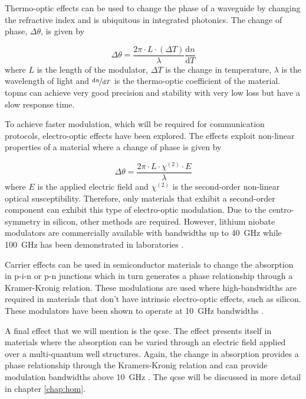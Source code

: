 Thermo-optic effects can be used to change the phase of a waveguide by changing the refractive index and is ubiquitous in integrated photonics. The change of phase, $\Delta\theta$, is given by

\begin{equation}
	\Delta\theta = \frac{2\pi\cdot L\cdot (\Delta T)}{\lambda}\frac{\mathrm{d}n}{\mathrm{d}T}
\end{equation}
where $L$ is the length of the modulator, $\Delta T$ is the change in temperature, $\lambda$ is the wavelength of light and $\nicefrac{\mathrm{d}n}{\mathrm{d}T}$ is the thermo-optic coefficient of the material. \Acp{topm} can achieve very good precision and stability with very low loss but have a slow response time. 

To achieve faster modulation, which will be required for communication protocols, electro-optic effects have been explored. The effects exploit non-linear properties of a material where a change of phase is given by

\begin{equation}
	\Delta\theta = \frac{2\pi\cdot L\cdot  \chi^{(2)}\cdot E}{\lambda}
\end{equation}
where $E$ is the applied electric field and $\chi^{(2)}$ is the second-order non-linear optical susceptibility. Therefore, only materials that exhibit a second-order component can exhibit this type of electro-optic modulation. Due to the centro-symmetry in silicon, other methods are required. However, lithium niobate modulators are commercially available with bandwidths up to \SI{40}{GHz} while \SI{100}{GHz} has been demonstrated in laboratories \cite{Louay2001Advances, Atsushi2010NRZ}.

Carrier effects can be used in semiconductor materials to change the absorption in p-i-n or p-n junctions which in turn generates a phase relationship through a Kramer-Kronig relation. These modulations are used where high-bandwidths are required in materials that don't have intrinsic electro-optic effects, such as silicon. These modulators have been shown to operate at \SI{10}{GHz} bandwidths \cite{Sibson2017Si}.

A final effect that we will mention is the \ac{qcse}. The effect presents itself in materials where the absorption can be varied through an electric field applied over a multi-quantum well structures. Again, the change in absorption provides a phase relationship through the Kramers-Kronig relation and can provide modulation bandwidths above \SI{10}{GHz} \cite{Sibson2017InP, semenenko2019integrated, semenenko2019mdi, semenenko2019, smit2014}. The \ac{qcse} will be discussed in more detail in chapter \ref{chap:hom}.

